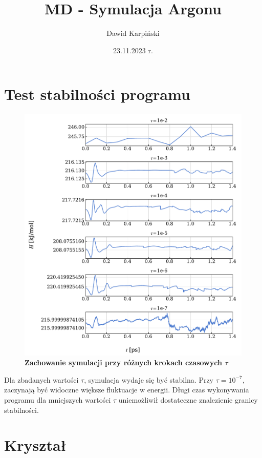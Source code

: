 \documentclass[11pt,a4paper]{article}
\begin{document}
\title{\textbf{MD - Symulacja Argonu}}
\author{Dawid Karpiński}
\date{23.11.2023 r.}
\maketitle
\pagebreak

\section{Test stabilności programu}

\begin{figure}[ht!]
    \caption{\textbf{Zachowanie symulacji przy różnych krokach czasowych $\tau$}}
    \vspace{0.2cm}
    \includegraphics[width=\textwidth]{../figures/stability.pdf}
\end{figure}

Dla zbadanych wartości $\tau$, symulacja wydaje się być stabilna. Przy $\tau=10^{-7}$, zaczynają być widoczne większe fluktuacje w energii. Długi czas wykonywania programu dla mniejszych wartości $\tau$ uniemożliwił dostateczne znalezienie granicy stabilności.

\section{Kryształ}
\end{document}
